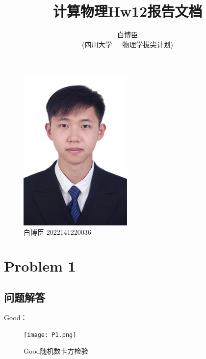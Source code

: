 \documentclass[12pt,a4paper]{article}%
\title{\fontsize{18pt}{27pt}\selectfont%
{\heiti%
计算物理Hw12报告文档}}%
\author{\fontsize{12pt}{18pt}\selectfont%
{\fangsong%
白博臣}\\%
\fontsize{10.5pt}{15.75pt}\selectfont%
{\fangsong%
(四川大学~~~物理学拔尖计划)}}%
\date{}%
\begin{document}
    \maketitle%
    \lhead{}%
    \chead{}%
    \rhead{}%
    \lfoot{}%
    \cfoot{\thepage}%
    \rfoot{}%

    \begin{figure}[htbp]
        \centering
        \includegraphics[height=8cm]{bbc.jpg}
        \caption{白博臣 2022141220036}
    \end{figure}


    \newpage%


    \section{Problem 1}
    \subsection{问题解答}
    Good：
    \begin{figure}[htbp]
        \centering
        \texttt{[image: P1.png]}\label{fig:figure4}
        \caption{Good随机数卡方检验}
    \end{figure}
\end{document}
